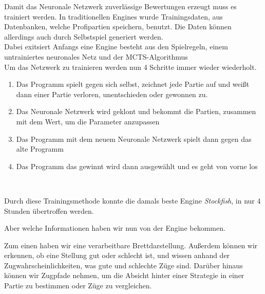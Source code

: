\newpage

Damit das Neuronale Netzwerk zuverlässige Bewertungen erzeugt muss es trainiert werden. In traditionellen Engines wurde Trainingsdaten, aus Datenbanken, welche Profipartien speichern, benutzt. Die Daten können allerdings auch durch Selbstspiel generiert werden.\\

Dabei exitsiert Anfangs eine Engine besteht aus den Spielregeln, einem untrainiertes neuronales Netz und der MCTS-Algorithmus\\

Um das Netzwerk zu trainieren werden nun 4 Schritte immer wieder wiederholt.

\begin{enumerate}[leftmargin=*]
\item Das Programm spielt gegen sich selbst, zeichnet jede Partie auf und weißt dann einer Partie verloren, unentschieden oder gewonnen zu.
\item Das Neuronale Netzwerk wird geklont und bekommt die Partien, zusammen mit dem Wert, um die Parameter anzupassen
\item Das Programm mit dem neuem Neuronale Netzwerk spielt dann gegen das alte Programm
\item Das Programm das gewinnt wird dann ausgewählt und es geht von vorne los
\end{enumerate}\

Durch diese Trainingsmethode konnte die damals beste Engine \textit{Stockfish}, in nur 4 Stunden übertroffen werden.

\newpage

Aber welche Informationen haben wir nun von der Engine bekommen.

Zum einen haben wir eine verarbeitbare Brettdarstellung. Außerdem können wir erkennen, ob eine Stellung gut oder schlecht ist, und wissen anhand der Zugwahrscheinlichkeiten, was gute und schlechte Züge sind. Darüber hinaus können wir Zugpfade nehmen, um die Absicht hinter einer Strategie in einer Partie zu bestimmen oder Züge zu vergleichen.